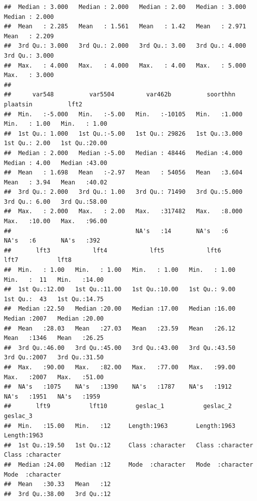 \documentclass[
]{book}
\begin{document}
\begin{verbatim}
##  Median : 3.000   Median : 2.000   Median : 2.00   Median : 3.000   Median : 2.000  
##  Mean   : 2.285   Mean   : 1.561   Mean   : 1.42   Mean   : 2.971   Mean   : 2.209  
##  3rd Qu.: 3.000   3rd Qu.: 2.000   3rd Qu.: 3.00   3rd Qu.: 4.000   3rd Qu.: 3.000  
##  Max.   : 4.000   Max.   : 4.000   Max.   : 4.00   Max.   : 5.000   Max.   : 3.000  
##                                                                                     
##      var548          var5504         var462b          soorthhn        plaatsin          lft2      
##  Min.   :-5.000   Min.   :-5.00   Min.   :-10105   Min.   :1.000   Min.   : 1.00   Min.   : 1.00  
##  1st Qu.: 1.000   1st Qu.:-5.00   1st Qu.: 29826   1st Qu.:3.000   1st Qu.: 2.00   1st Qu.:20.00  
##  Median : 2.000   Median :-5.00   Median : 48446   Median :4.000   Median : 4.00   Median :43.00  
##  Mean   : 1.698   Mean   :-2.97   Mean   : 54056   Mean   :3.604   Mean   : 3.94   Mean   :40.02  
##  3rd Qu.: 2.000   3rd Qu.: 1.00   3rd Qu.: 71490   3rd Qu.:5.000   3rd Qu.: 6.00   3rd Qu.:58.00  
##  Max.   : 2.000   Max.   : 2.00   Max.   :317482   Max.   :8.000   Max.   :10.00   Max.   :96.00  
##                                   NA's   :14       NA's   :6       NA's   :6       NA's   :392    
##       lft3            lft4            lft5            lft6            lft7           lft8      
##  Min.   : 1.00   Min.   : 1.00   Min.   : 1.00   Min.   : 1.00   Min.   :  11   Min.   :14.00  
##  1st Qu.:12.00   1st Qu.:11.00   1st Qu.:10.00   1st Qu.: 9.00   1st Qu.:  43   1st Qu.:14.75  
##  Median :22.50   Median :20.00   Median :17.00   Median :16.00   Median :2007   Median :20.00  
##  Mean   :28.03   Mean   :27.03   Mean   :23.59   Mean   :26.12   Mean   :1346   Mean   :26.25  
##  3rd Qu.:46.00   3rd Qu.:45.00   3rd Qu.:43.00   3rd Qu.:43.50   3rd Qu.:2007   3rd Qu.:31.50  
##  Max.   :90.00   Max.   :82.00   Max.   :77.00   Max.   :99.00   Max.   :2007   Max.   :51.00  
##  NA's   :1075    NA's   :1390    NA's   :1787    NA's   :1912    NA's   :1951   NA's   :1959   
##       lft9           lft10        geslac_1           geslac_2           geslac_3        
##  Min.   :15.00   Min.   :12     Length:1963        Length:1963        Length:1963       
##  1st Qu.:19.50   1st Qu.:12     Class :character   Class :character   Class :character  
##  Median :24.00   Median :12     Mode  :character   Mode  :character   Mode  :character  
##  Mean   :30.33   Mean   :12                                                             
##  3rd Qu.:38.00   3rd Qu.:12                                                             

\end{verbatim}
\end{document}
